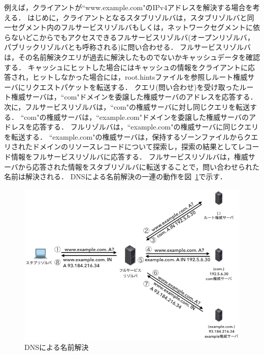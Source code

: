 例えば，クライアントが``www.example.com"のIPv4アドレスを解決する場合を考える．
はじめに，クライアントとなるスタブリゾルバは，スタブリゾルバと同一セグメント内のフルサービスリゾルバもしくは，ネットワークセグメントに依らないどこからでもアクセスできるフルサービスリゾルバ(オープンリゾルバ，パブリックリゾルバとも呼称される)に問い合わせる．
フルサービスリゾルバは，その名前解決クエリが過去に解決したものでないかキャッシュデータを確認する．
キャッシュにヒットした場合にはキャッシュの情報をクライアントに応答され，ヒットしなかった場合には，root.hintsファイルを参照しルート権威サーバにリクエストパケットを転送する．
クエリ(問い合わせ)を受け取ったルート権威サーバは，``com"ドメインを委譲した権威サーバのアドレスを応答する．
次に，フルサービスリゾルバは，``com"の権威サーバに対し同じクエリを転送する．
``com"の権威サーバは，``example.com"ドメインを委譲した権威サーバのアドレスを応答する．
フルリゾルバは，``example.com"の権威サーバに同じクエリを転送する．
``example.com"の権威サーバは，保持するゾーンファイルからクエリされたドメインのリソースレコードについて探索し，探索の結果としてレコード情報をフルサービスリゾルバに応答する．
フルサービスリゾルバは，権威サーバから応答された情報をスタブリゾルバに転送することで，問い合わせられた名前は解決される．
DNSによる名前解決の一連の動作を図~\ref{fig:dns-name-resolution}で示す．
\begin{figure}[htbp]
 \centering
 \includegraphics[width=12.0cm]{figure/dns-name-resolution.png}
 \caption{DNSによる名前解決}
 \label{fig:dns-name-resolution}
\end{figure}




\newpage
